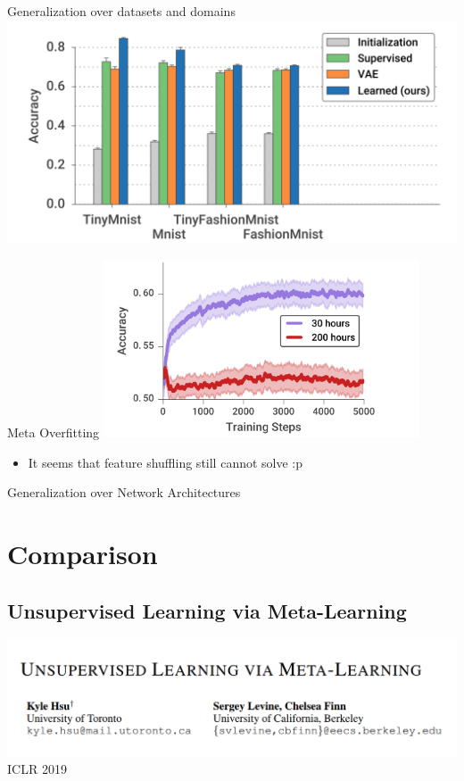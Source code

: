\documentclass{beamer}
\begin{document}
\begin{frame}{Generalization over datasets and domains}
  \center \includegraphics[width=\textwidth]{fig/mnist.png}
\end{frame}

\begin{frame}{Meta Overfitting}
  \center \includegraphics[width=0.7\textwidth]{fig/meta-overfitting.png}
  \begin{itemize}
    \item It seems that feature shuffling still cannot solve :p
  \end{itemize}
\end{frame}

\begin{frame}{Generalization over Network Architectures}
\end{frame}

\section{Comparison}
\subsection{Unsupervised Learning via Meta-Learning}

\begin{frame}
  \includegraphics[width=\textwidth]{fig/ULML.png}
  \center ICLR 2019
\end{frame}
\end{document}
